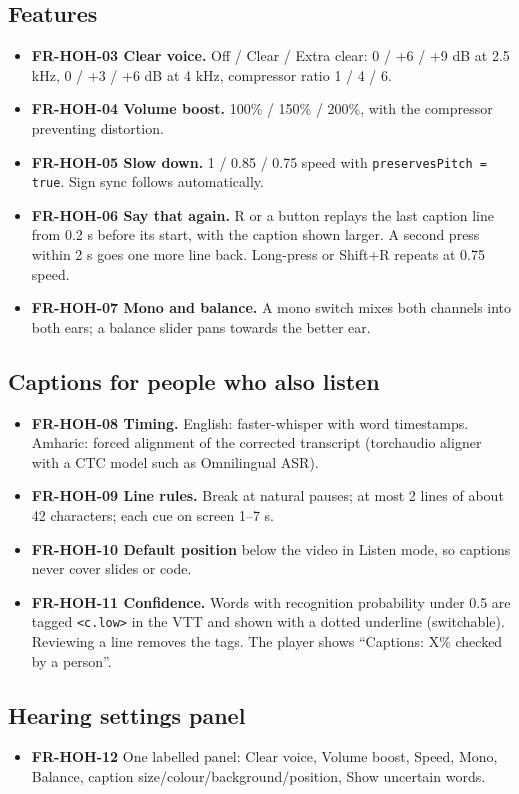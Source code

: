 \documentclass[11pt,a4paper]{article}
\newcommand{\code}[1]{\texttt{#1}}
\newcommand{\req}[1]{\textbf{#1}}
\begin{document}
\subsection{Features}
\begin{itemize}
  \item \req{FR-HOH-03 Clear voice.} Off / Clear / Extra clear: 0 / +6 / +9 dB at 2.5 kHz, 0 / +3 / +6 dB at 4 kHz, compressor ratio 1 / 4 / 6.
  \item \req{FR-HOH-04 Volume boost.} 100\% / 150\% / 200\%, with the compressor preventing distortion.
  \item \req{FR-HOH-05 Slow down.} 1 / 0.85 / 0.75 speed with \code{preservesPitch = true}. Sign sync follows automatically.
  \item \req{FR-HOH-06 Say that again.} R or a button replays the last caption line from 0.2 s before its start, with the caption shown larger. A second press within 2 s goes one more line back. Long-press or Shift+R repeats at 0.75 speed.
  \item \req{FR-HOH-07 Mono and balance.} A mono switch mixes both channels into both ears; a balance slider pans towards the better ear.
\end{itemize}

\subsection{Captions for people who also listen}
\begin{itemize}
  \item \req{FR-HOH-08 Timing.} English: faster-whisper with word timestamps. Amharic: forced alignment of the corrected transcript (torchaudio aligner with a CTC model such as Omnilingual ASR).
  \item \req{FR-HOH-09 Line rules.} Break at natural pauses; at most 2 lines of about 42 characters; each cue on screen 1--7 s.
  \item \req{FR-HOH-10 Default position} below the video in Listen mode, so captions never cover slides or code.
  \item \req{FR-HOH-11 Confidence.} Words with recognition probability under 0.5 are tagged \code{<c.low>} in the VTT and shown with a dotted underline (switchable). Reviewing a line removes the tags. The player shows ``Captions: X\% checked by a person''.
\end{itemize}

\subsection{Hearing settings panel}
\begin{itemize}
  \item \req{FR-HOH-12} One labelled panel: Clear voice, Volume boost, Speed, Mono, Balance, caption size/colour/background/position, Show uncertain words.
\end{itemize}
\end{document}
